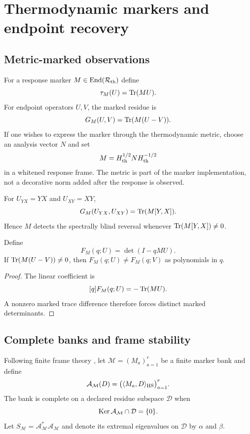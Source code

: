 \section{Thermodynamic markers and endpoint recovery}

\subsection{Metric-marked observations}

For a response marker $M\in\operatorname{End}(\mathcal R_{\mathrm{th}})$ define
\[
 \tau_M(U)=\operatorname{Tr}(MU).
\]
For endpoint operators $U,V$, the marked residue is
\[
 G_M(U,V)=\operatorname{Tr}(M(U-V)).
\]
If one wishes to express the marker through the thermodynamic metric, choose an analysis vector $N$ and set
\[
 M=H_{\mathrm{th}}^{1/2}NH_{\mathrm{th}}^{-1/2}
\]
in a whitened response frame. The metric is part of the marker implementation, not a decorative norm added after the response is observed.

\begin{theorem}
For $U_{YX}=YX$ and $U_{XY}=XY$,
\[
 G_M(U_{YX},U_{XY})=\operatorname{Tr}(M[Y,X]).
\]
Hence $M$ detects the spectrally blind reversal whenever $\operatorname{Tr}(M[Y,X])\ne0$.
\end{theorem}

\begin{theorem}
Define
\[
 F_M(q;U)=\det(I-qMU).
\]
If $\operatorname{Tr}(M(U-V))\ne0$, then $F_M(q;U)\ne F_M(q;V)$ as polynomials in $q$.
\end{theorem}

\begin{proof}
The linear coefficient is
\[
 [q]F_M(q;U)=-\operatorname{Tr}(MU).
\]
A nonzero marked trace difference therefore forces distinct marked determinants.
\end{proof}

\subsection{Complete banks and frame stability}

Following finite frame theory \cite{duffin1952,christensen2016}, let $\mathcal M=(M_a)_{a=1}^r$ be a finite marker bank and define
\[
 \mathcal A_{\mathcal M}(D)
 =\bigl(\langle M_a,D\rangle_{\mathrm{HS}}\bigr)_{a=1}^r.
\]
The bank is complete on a declared residue subspace $\mathcal D$ when
\[
 \operatorname{Ker}\mathcal A_{\mathcal M}\cap\mathcal D=\{0\}.
\]
Let $S_{\mathcal M}=\mathcal A_{\mathcal M}^*\mathcal A_{\mathcal M}$ and denote its extremal eigenvalues on $\mathcal D$ by $\alpha$ and $\beta$.

